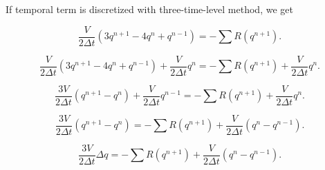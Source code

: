 \documentclass{report}
\begin{document}
If temporal term is discretized with three-time-level method, we get

\begin{equation}
    \frac{V}{2\Delta t} (3q^{n+1}-4q^n+q^{n-1}) = -\sum R(q^{n+1}).
\end{equation}

\begin{equation}
    \frac{V}{2\Delta t} (3q^{n+1}-4q^n+q^{n-1}) + \frac{V}{2\Delta t} q^n = -\sum R(q^{n+1}) + \frac{V}{2\Delta t} q^n.
\end{equation}

\begin{equation}
    \frac{3V}{2\Delta t} (q^{n+1}-q^n) + \frac{V}{2\Delta t} q^{n-1} = -\sum R(q^{n+1}) + \frac{V}{2\Delta t} q^n.
\end{equation}

\begin{equation}
    \frac{3V}{2\Delta t} (q^{n+1}-q^n) = -\sum R(q^{n+1}) + \frac{V}{2\Delta t} (q^n - q^{n-1}).
\end{equation}

\begin{equation}
    \frac{3V}{2\Delta t} \Delta q = -\sum R(q^{n+1}) + \frac{V}{2\Delta t} (q^n - q^{n-1}).
\end{equation}
\end{document}
